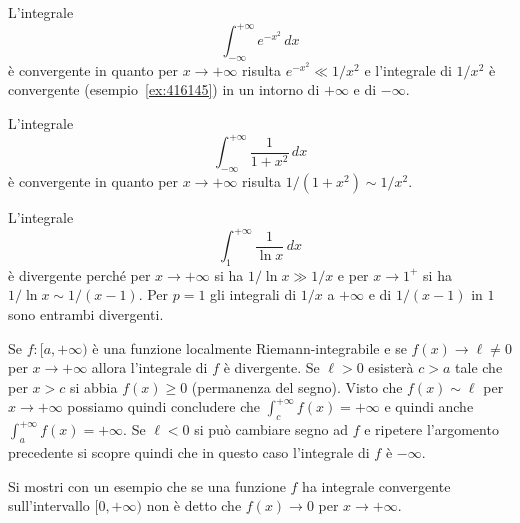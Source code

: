 \begin{example}
L'integrale
\[
 \int_{-\infty}^{+\infty}e^{-x^2}\, dx
\]
è convergente in quanto per $x\to +\infty$ risulta $e^{-x^2} \ll 1/x^2$
e l'integrale di $1/x^2$ è convergente (esempio~\ref{ex:416145})
in un intorno di $+\infty$ e di $-\infty$.

L'integrale
\[
  \int_{-\infty}^{+\infty}\frac{1}{1+x^2}\, dx
\]
è convergente in quanto per $x\to +\infty$ risulta $1/(1+x^2) \sim 1/x^2$.

L'integrale
\[
  \int_1^{+\infty} \frac{1}{\ln x}\, dx
\]
è divergente perché per $x\to +\infty$
si ha $1/\ln x \gg 1/x$ e per $x\to 1^+$ si ha
$1/\ln x \sim 1/(x-1)$. Per $p=1$ gli integrali
di $1/x$ a $+\infty$ e di $1/(x-1)$ in $1$
sono entrambi divergenti.

Se $f\colon [a,+\infty)$ è una funzione localmente Riemann-integrabile
e se $f(x)\to \ell \neq 0$ per $x\to +\infty$ allora l'integrale
di $f$ è divergente. Se $\ell>0$ esisterà $c>a$ tale che per $x>c$
si abbia $f(x)\ge 0$ (permanenza del segno). Visto che
$f(x)\sim \ell$ per $x\to +\infty$ possiamo quindi concludere
che $\int_c^{+\infty} f(x) = +\infty$ e
quindi anche
$\int_a^{+\infty} f(x) = +\infty$.
Se $\ell<0$ si può cambiare segno ad $f$ e ripetere l'argomento precedente
si scopre quindi che in questo caso l'integrale di $f$ è $-\infty$.
\end{example}

\begin{exercise}
Si mostri con un esempio che se una funzione $f$ ha integrale
convergente sull'intervallo $[0,+\infty)$ non
è detto che $f(x)\to 0$ per $x\to +\infty$.
\end{exercise}

\begin{comment}
\begin{exercise}[difficile]
Mostrare che l'integrale
\[
  \int_0^{+\infty} \exp\enclose{x^2 \ln \frac{2+\cos(2\pi x)}{3}} \, dx
\]
è finito. Ma la funzione integranda non tende a zero per $x\to +\infty$.
\end{exercise}
\end{comment}

